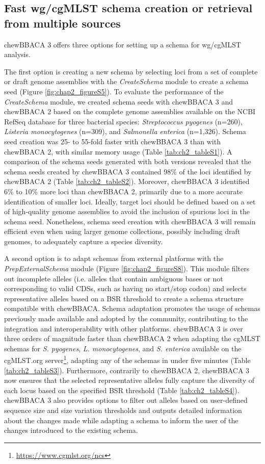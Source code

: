 \subsection{Fast wg/cgMLST schema creation or retrieval from multiple sources} \label{ssec:ch2_results_discussion_ssec1}

chewBBACA 3 offers three options for setting up a schema for \ac{wg/cgMLST} analysis.

The first option is creating a new schema by selecting loci from a set of complete or draft genome assemblies with the \textit{CreateSchema} module to create a schema seed (Figure \ref{fig:chap2_figureS5}). To evaluate the performance of the \textit{CreateSchema} module, we created schema seeds with chewBBACA 3 and chewBBACA 2 based on the complete genome assemblies available on the \ac{NCBI} RefSeq database \citep{sayers_database_2022} for three bacterial species: \textit{Streptococcus pyogenes} (n=260), \textit{Listeria monocytogenes} (n=309), and \textit{Salmonella enterica} (n=1,326). Schema seed creation was 25- to 55-fold faster with chewBBACA 3 than with chewBBACA 2, with similar memory usage (Table \ref{tab:ch2_tableS1}). A comparison of the schema seeds generated with both versions revealed that the schema seeds created by chewBBACA 3 contained 98\% of the loci identified by chewBBACA 2 (Table \ref{tab:ch2_tableS2}). Moreover, chewBBACA 3 identified 6\% to 10\% more loci than chewBBACA 2, primarily due to a more accurate identification of smaller loci. Ideally, target loci should be defined based on a set of high-quality genome assemblies to avoid the inclusion of spurious loci in the schema seed. Nonetheless, schema seed creation with chewBBACA 3 will remain efficient even when using larger genome collections, possibly including draft genomes, to adequately capture a species diversity.

A second option is to adapt schemas from external platforms with the \textit{PrepExternalSchema} module (Figure \ref{fig:chap2_figureS8}). This module filters out incomplete alleles (i.e. alleles that contain ambiguous bases or not corresponding to valid \acp{CDS}, such as having no start/stop codon) and selects representative alleles based on a \ac{BSR} threshold to create a schema structure compatible with chewBBACA. Schema adaptation promotes the usage of schemas previously made available and adopted by the community, contributing to the integration and interoperability with other platforms. chewBBACA 3 is over three orders of magnitude faster than chewBBACA 2 when adapting the \ac{cgMLST} schemas for \textit{S. pyogenes}, \textit{L. monocytogenes}, and \textit{S. enterica} available on the cgMLST.org server\footnote{\url{https://www.cgmlst.org/ncs}}, adapting any of the schemas in under five minutes (Table \ref{tab:ch2_tableS3}). Furthermore, contrarily to chewBBACA 2, chewBBACA 3 now ensures that the selected representative alleles fully capture the diversity of each locus based on the specified \ac{BSR} threshold (Table \ref{tab:ch2_tableS4}). chewBBACA 3 also provides options to filter out alleles based on user-defined sequence size and size variation thresholds and outputs detailed information about the changes made while adapting a schema to inform the user of the changes introduced to the existing schema.

